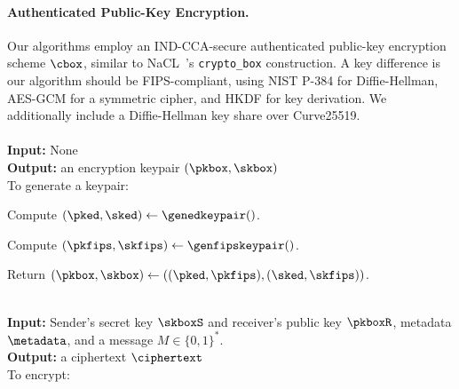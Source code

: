 \paragraph{Authenticated Public-Key Encryption.} Our algorithms employ an IND-CCA-secure authenticated public-key encryption scheme ${\sf \cbox}$, similar to NaCL~\cite{nacl}'s \texttt{crypto\_box} construction. A key difference is our algorithm should be FIPS-compliant, using NIST P-384 for Diffie-Hellman, AES-GCM for a symmetric cipher, and HKDF for key derivation. We additionally include a Diffie-Hellman key share over Curve25519.\\


{\underline {\bf \cboxkeygen}}\\
{\bf Input:} None \\
{\bf Output:} an encryption keypair $(\pkbox, \skbox)$ \\

\vspace{-1.5em}
To generate a keypair:

\vspace{-1.5em}
\begingroup
\RaggedRight
\begin{enumerate*}
\item Compute $(\pked, \sked) \leftarrow \genedkeypair()$.
\item Compute $(\pkfips, \skfips) \leftarrow \genfipskeypair()$.
\item Return $(\pkbox, \skbox) \leftarrow \left( (\pked, \pkfips), (\sked, \skfips) \right)$.
\end{enumerate*}
\endgroup


{\underline {\bf \cboxencrypt}} \\
{\bf Input:} Sender's secret key $\skboxS$ and receiver's public key $\pkboxR$, metadata $\metadata$, and a message $M \in \{0,1\}^{*}$. \\
{\bf Output:} a ciphertext $\ciphertext$ \\

\vspace{-1.5em}
To encrypt:

